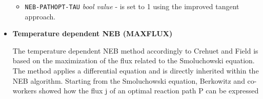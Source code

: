 \documentclass[10pt,a4paper]{article} %
\begin{document}
\begin{itemize}
	\begin{itemize}
		
		\item \texttt{NEB-PATHOPT-TAU} \textit{bool value} - is set to 1 using the improved tangent approach.
		
	\end{itemize}
	
	
	
	\item \textbf{Temperature dependent NEB (MAXFLUX)}
	
	The temperature dependent NEB method accordingly to Crehuet and Field  is based on the maximization of the flux related to the Smoluchowski equation\supercite{Smoluchowski1916}. The method applies a differential equation and is directly inherited within the NEB algorithm. Starting from the Smoluchowski equation, Berkowitz and co-workers\supercite{Berkowitz1983} showed how the flux j of an optimal reaction path P can be expressed
	

\end{itemize}
\end{document}
